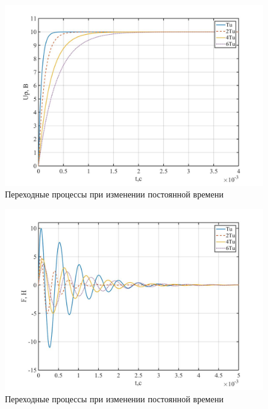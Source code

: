 \documentclass[a4paper, 12pt]{article}
\begin{document}
\begin{figure}[h!]
	\centering
	\includegraphics[width = 0.6\textheight]{data/Up_tu}
	\caption{Переходные процессы при изменении постоянной времени}
	\label{Up_tu}
\end{figure}

\newpage

\begin{figure}[h!]
	\centering
	\includegraphics[width = 0.6\textheight]{data/F_tu}
	\caption{Переходные процессы при изменении постоянной времени}
	\label{F_tu}
\end{figure}
\end{document}
